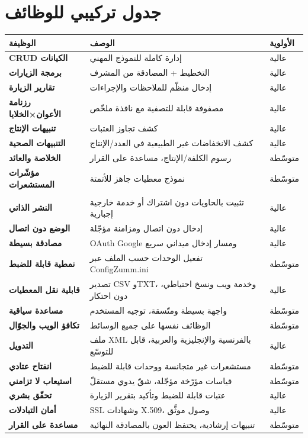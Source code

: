 \section{جدول تركيبي للوظائف}
\begin{xltabular}{\textwidth}{>{\bfseries}p{3.4cm} X C{2.2cm}}
\toprule
\textbf{الوظيفة} & \textbf{الوصف} & \textbf{الأولوية} \\
\midrule
\endhead
CRUD الكيانات       & إدارة كاملة للنموذج المهني                        & عالية \\
برمجة الزيارات      & التخطيط + المصادقة من المشرف                      & عالية \\
تقارير الزيارة      & إدخال منظّم للملاحظات والإجراءات                  & عالية \\
رزنامة الأعوان×الخلايا & مصفوفة قابلة للتصفية مع نافذة ملخّص             & عالية \\
تنبيهات الإنتاج     & كشف تجاوز العتبات                                 & عالية \\
التنبيهات الصحية    & كشف الانخفاضات غير الطبيعية في العدد/الإنتاج      & عالية \\
الخلاصة والعائد     & رسوم الكلفة/الإنتاج، مساعدة على القرار            & متوسّطة \\
مؤشّرات المستشعرات  & نموذج معطيات جاهز للأتمتة                         & متوسّطة \\
\midrule
{} \\
\midrule
النشر الذاتي        & تثبيت بالحاويات دون اشتراك أو خدمة خارجية إجبارية & عالية \\
الوضع دون اتصال     & إدخال دون اتصال ومزامنة مؤجّلة                    & عالية \\
مصادقة بسيطة        & OAuth Google ومسار إدخال ميداني سريع             & عالية \\
نمطية قابلة للضبط   & تفعيل الوحدات حسب الملف عبر ConfigZumm.ini        & متوسّطة \\
قابلية نقل المعطيات & تصدير CSV وTXT، وخدمة ويب ونسخ احتياطي، دون احتكار & عالية \\
مساعدة سياقية       & واجهة بسيطة ومتّسقة، توجيه المستخدم               & متوسّطة \\
تكافؤ الويب والجوّال & الوظائف نفسها على جميع الوسائط                    & متوسّطة \\
التدويل             & ملف XML بالفرنسية والإنجليزية والعربية، قابل للتوسّع & عالية \\
انفتاح عتادي        & مستشعرات غير متجانسة ووحدات قابلة للضبط           & متوسّطة \\
استيعاب لا تزامني   & قياسات مؤرّخة مؤجّلة، شقّ يدوي مستقلّ             & متوسّطة \\
تحقّق بشري          & عتبات قابلة للضبط وتأكيد بتقرير الزيارة           & عالية \\
أمان التبادلات      & SSL وشهادات X.509، وصول موثَّق                    & عالية \\
مساعدة على القرار   & تنبيهات إرشادية، يحتفظ العون بالمصادقة النهائية   & متوسّطة \\
\bottomrule
\end{xltabular}

